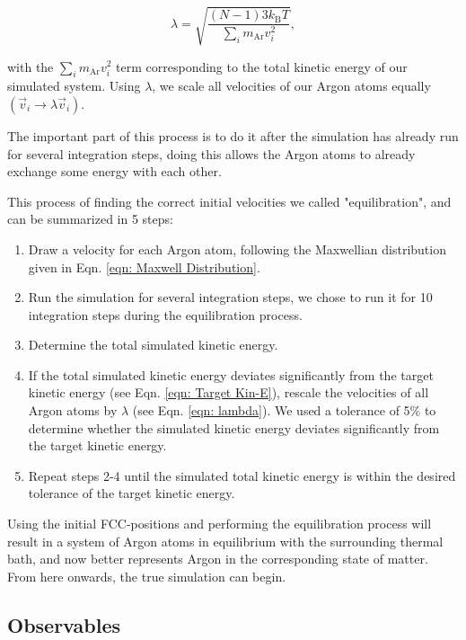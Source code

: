 \documentclass{IAYCPro}
\begin{document}
\begin{equation}
    \lambda = \sqrt{\frac{(N-1)3k_\mathrm{B}T}{\sum_i m_\mathrm{Ar}v_i^2}},
    \label{eqn: lambda}
\end{equation}

with the $\sum_i m_\mathrm{Ar}v_i^2$ term corresponding to the total kinetic energy of our simulated system. Using $\lambda$, we scale all velocities of our Argon atoms equally $(\vec{v}_i \rightarrow \lambda \vec{v}_i)$. 

\raggedbottom
\newpage

The important part of this process is to do it after the simulation has already run for several integration steps, doing this allows the Argon atoms to already exchange some energy with each other. 

This process of finding the correct initial velocities we called "equilibration", and can be summarized in 5 steps:
\begin{enumerate}
    \item Draw a velocity for each Argon atom, following the Maxwellian distribution given in Eqn. \ref{eqn: Maxwell Distribution}.
    \item Run the simulation for several integration steps, we chose to run it for 10 integration steps during the equilibration process.
    \item Determine the total simulated kinetic energy.
    \item If the total simulated kinetic energy deviates significantly from the target kinetic energy (see Eqn. \ref{eqn: Target Kin-E}), rescale the velocities of all Argon atoms by $\lambda$ (see Eqn. \ref{eqn: lambda}). We used a tolerance of 5\% to determine whether the simulated kinetic energy deviates significantly from the target kinetic energy.
    \item Repeat steps 2-4 until the simulated total kinetic energy is within the desired tolerance of the target kinetic energy.
\end{enumerate}

Using the initial FCC-positions and performing the equilibration process will result in a system of Argon atoms in equilibrium with the surrounding thermal bath, and now better represents Argon in the corresponding state of matter. From here onwards, the true simulation can begin.

\subsection{Observables}
\end{document}
